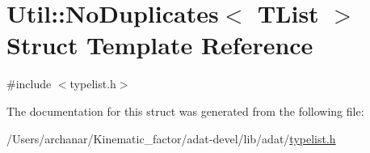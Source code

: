 \hypertarget{structUtil_1_1TL_1_1NoDuplicates}{}\section{Util\+:\+:No\+Duplicates$<$ T\+List $>$ Struct Template Reference}
\label{structUtil_1_1TL_1_1NoDuplicates}


{\ttfamily \#include $<$typelist.\+h$>$}



The documentation for this struct was generated from the following file\+:\begin{DoxyCompactItemize}
\item 
/\+Users/archanar/\+Kinematic\+\_\+factor/adat-\/devel/lib/adat/\mbox{\hyperlink{adat-devel_2lib_2adat_2typelist_8h}{typelist.\+h}}\end{DoxyCompactItemize}
